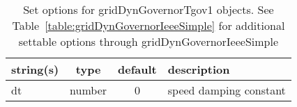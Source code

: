 \begin{table}[ht]
\centering
\begin{tabular}{p{5cm} c c p{7cm}}
\hline
string(s) & type & default & description \\
\hline
dt & number & 0 & speed damping constant\\
\hline
\end{tabular}
\caption{Set options for gridDynGovernorTgov1 objects. See Table~\ref{table:gridDynGovernorIeeeSimple} for additional settable options through gridDynGovernorIeeeSimple}
\label{table:gridDynGovernorTgov1}
\end{table}


